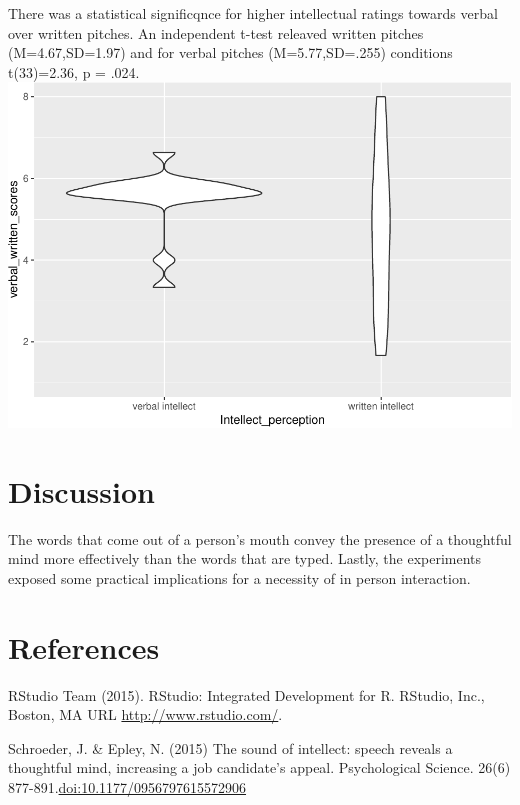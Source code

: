 \documentclass[man]{apa6}
\begin{document}
There was a statistical significqnce for higher intellectual ratings
towards verbal over written pitches. An independent t-test releaved
written pitches (M=4.67,SD=1.97) and for verbal pitches (M=5.77,SD=.255)
conditions t(33)=2.36, p = .024.
\includegraphics{Mid-Term_files/figure-latex/unnamed-chunk-1-1.pdf}

\section{Discussion}\label{discussion}

The words that come out of a person's mouth convey the presence of a
thoughtful mind more effectively than the words that are typed. Lastly,
the experiments exposed some practical implications for a necessity of
in person interaction.

\newpage

\section{References}\label{references}

RStudio Team (2015). RStudio: Integrated Development for R. RStudio,
Inc., Boston, MA URL \url{http://www.rstudio.com/}.

Schroeder, J. \& Epley, N. (2015) The sound of intellect: speech reveals
a thoughtful mind, increasing a job candidate's appeal. Psychological
Science. 26(6) 877-891.\url{doi:10.1177/0956797615572906}

\begingroup
\setlength{\parindent}{-0.5in} \setlength{\leftskip}{0.5in}

\hypertarget{refs}{}

\endgroup
\end{document}
